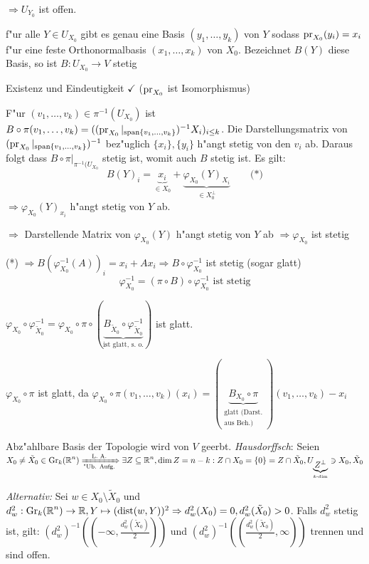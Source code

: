 $\Rightarrow U_{Y_0}$ ist offen.
\begin{description}[font=\normalfont\bfseries]
\item[zu 2)]\begin{description}[font=\normalfont\itshape]
	\item[Behauptung:] f"ur alle $Y \in U_{X_0}$ gibt es genau eine Basis $(y_1,\ldots ,y_k)$ von $Y$ sodass $\operatorname{pr}_{X_0}(y_i) = x_i$ f"ur eine feste Orthonormalbasis $(x_1,\ldots ,x_k)$ von $X_0$. Bezeichnet $B(Y)$ diese Basis, so ist $B: U_{X_0} \to V$ stetig
	\item[Beweis:] Existenz und Eindeutigkeit $\checkmark$ ($\operatorname{pr}_{X_0}$ ist Isomorphismus)
		
		F"ur $(v_1,\ldots ,v_k) \in \pi^{-1}(U_{X_0})$ ist $B \circ \pi(v_1,\ldots ,v_k) = ((\operatorname{pr}_{X_0}|_{\operatorname{span}\{v_1,\ldots ,v_k\}})^{-1} X_i)_{i \le k}$. Die Darstellungsmatrix von $(\operatorname{pr}_{X_0}|_{\operatorname{span}\{v_1,\ldots ,v_k\}})^{-1}$ bez"uglich $\{x_i\}, \{y_i\}$ h"angt stetig von den $v_i$ ab. Daraus folgt dass $B \circ \pi|_{\pi^{-1}(U_{X_0}}$ stetig ist, womit auch $B$ stetig ist. Es gilt:
			\[ B(Y)_i = \underbrace{x_i}_{\in X_0} + \underbrace{\varphi_{X_0}(Y)_{X_i}}_{\in X_0^\perp} \qquad \text{(*)} \]
		$\Rightarrow \varphi_{X_0}(Y)_{x_i}$ h"angt stetig von $Y$ ab.
		
		$\Rightarrow$ Darstellende Matrix von $\varphi_{X_0}(Y)$ h"angt stetig von $Y$ ab $\Rightarrow \varphi_{X_0}$ ist stetig
		
		(*) $\Rightarrow B(\varphi_{X_0}^{-1}(A))_i = x_i + Ax_i \Rightarrow B \circ \varphi_{X_0}^{-1}$ ist stetig (sogar glatt)
			\[ \varphi_{X_0}^{-1} = (\pi \circ B) \circ \varphi_{X_0}^{-1} \text{ ist stetig} \]
	\end{description}
\item[zu 3)]
	$\varphi_{X_0} \circ \varphi_{\tilde X_0}^{-1} = \varphi_{X_0} \circ \pi \circ (\underbrace{B_{\tilde X_0} \circ \varphi_{\tilde X_0}^{-1}}_{\text{ist glatt, s. o.}})$ ist glatt.
	
	$\varphi_{X_0} \circ \pi$ ist glatt, da $\varphi_{X_0} \circ \pi(v_1,\ldots ,v_k)(x_i) = (\underbrace{B_{X_0} \circ \pi}_{\substack{\text{glatt (Darst.}\\ \text{aus Beh.)}}})(v_1,\ldots ,v_k) - x_i$
\item[zu 4)]
	Abz"ahlbare Basis der Topologie wird von $V$ geerbt. \emph{Hausdorffsch}: Seien $X_0 \ne \tilde X_0 \in \operatorname{Gr}_k(\operatorname{\mathbb{R}}^n) \xRightarrow[\text{"Ub. Aufg.}]{\text{L. A.}} \exists Z \subseteq \operatorname{\mathbb{R}}^n, \operatorname{dim} Z = n-k: Z \cap X_0 = \{0\} = Z \cap \tilde X_0, U_{\underbrace{Z^\perp}_{k\text{-dim}}} \ni X_0, \tilde X_0$
	
	\emph{Alternativ:} Sei $w \in X_0 \setminus \tilde X_0$ und $d_w^2: \operatorname{Gr}_k(\operatorname{\mathbb{R}}^n) \to \operatorname{\mathbb{R}}, Y \mapsto (\operatorname{dist}(w, Y))^2 \Rightarrow d_w^2(X_0) = 0, d_w^2(\tilde X_0) > 0$. Falls $d_w^2$ stetig ist, gilt: $(d_w^2)^{-1}((-\infty, \frac{d_w^2(\tilde X_0)}{2}))$ und $(d_w^2)^{-1}((\frac{d_w^2(\tilde X_0)}{2}, \infty))$ trennen und sind offen.
\end{description}